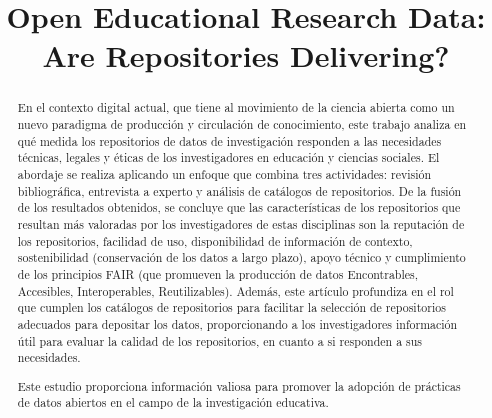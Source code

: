 \documentclass[runningheads]{llncs}
\title{Open Educational Research Data: Are Repositories Delivering?}
\begin{document}
\maketitle

\begin{abstract}
En el contexto digital actual, que tiene al movimiento de la ciencia abierta como un nuevo paradigma de producción y circulación de conocimiento, este trabajo analiza en qué medida los repositorios de datos de investigación responden a las necesidades técnicas, legales y éticas de los investigadores en educación y ciencias sociales. El abordaje se realiza aplicando un enfoque que combina tres actividades: revisión bibliográfica, entrevista a experto y análisis de catálogos de repositorios. De la fusión de los resultados obtenidos, se concluye que las características de los repositorios que resultan más valoradas por los investigadores de estas disciplinas son la reputación de los repositorios, facilidad de uso, disponibilidad de información de contexto, sostenibilidad (conservación de los datos a largo plazo), apoyo técnico y cumplimiento de los principios FAIR (que promueven la producción de datos Encontrables, Accesibles, Interoperables, Reutilizables). Además, este artículo profundiza en el rol que cumplen los catálogos de repositorios para facilitar la selección de repositorios adecuados para depositar los datos, proporcionando a los investigadores información útil para evaluar la calidad de los repositorios, en cuanto a si responden a sus necesidades.

Este estudio proporciona información valiosa para promover la adopción de prácticas de datos abiertos en el campo de la investigación educativa.




\end{abstract}
\end{document}
